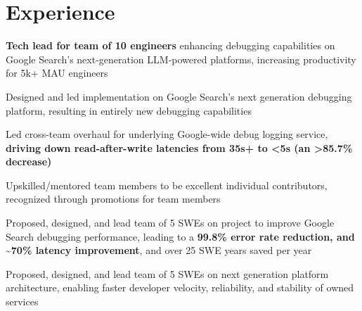 \documentclass[]{two-column-resume}
\begin{document}
{\begin{minipage}[t]{0.65\textwidth}
\section{Experience}

        \vspace{\topsep} %
        \begin{tightemize}
                            \item \textbf{Tech lead for team of 10 engineers} enhancing debugging capabilities on Google Search's next-generation LLM-powered platforms, increasing productivity for 5k+ MAU engineers
                            \item Designed and led implementation on Google Search's next generation debugging platform, resulting in entirely new debugging capabilities
                            \item Led cross-team overhaul for underlying Google-wide debug logging service, \textbf{driving down read-after-write latencies from 35s+ to <5s (an >85.7\% decrease)}
                            \item Upskilled/mentored team members to be excellent individual contributors, recognized through promotions for team members
                    \end{tightemize}
        \sectionsep
        \vspace{\topsep} %
        \begin{tightemize}
                            \item Proposed, designed, and lead team of 5 SWEs on project to improve Google Search debugging performance, leading to a \textbf{99.8\% error rate reduction, and \textasciitilde70\% latency improvement}, and over 25 SWE years saved per year
                            \item Proposed, designed, and lead team of 5 SWEs on next generation platform architecture, enabling faster developer velocity, reliability, and stability of owned services
                    \end{tightemize}
        \sectionsep
        \vspace{\topsep} %

\end{minipage}}
\end{document}
